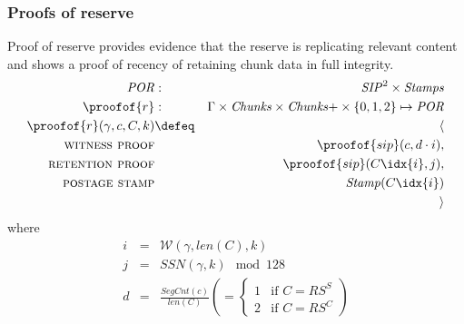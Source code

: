 \subsubsection{Proofs of reserve}
\label{sec:proofs}
    
\begin{definition}
\label{def:por}
Proof of reserve provides evidence that the reserve is replicating relevant content and shows a proof of recency of retaining chunk data in full integrity.
%
\begin{eqnarray}
\mathit{POR}&:&\mathit{SIP}^2\times\mathit{Stamps}\\
\proofof{r}&:&\Gamma\times\mathit{Chunks}\times\mathit{Chunks}{+}\times\{0,1,2\}\mapsto\mathit{POR}\\
\proofof{r}(\gamma,c,C,k)&\defeq&\langle\\
\textsc{witness proof}&&\proofof{sip}(c,d\cdot i), \\
\textsc{retention proof}&&\proofof{sip}(C\idx{i},j), \\
\textsc{postage stamp}&&\mathit{Stamp}(C\idx{i})\\
&&\rangle
\end{eqnarray}
where 
\begin{eqnarray}
i&=&\mathcal{W}(\gamma,\mathit{len}(C),k)\\
j&=& \mathit{SSN}(\gamma,k)\mod 128\\
d &=&\frac{\mathit{SegCnt}(c)}{\mathit{len}(C)} \left(=\begin{cases}
    1& \text{if } C=RS^S\\
2 &\text{if } C=RS^C
\end{cases}
\right)
\end{eqnarray}
\end{definition}


